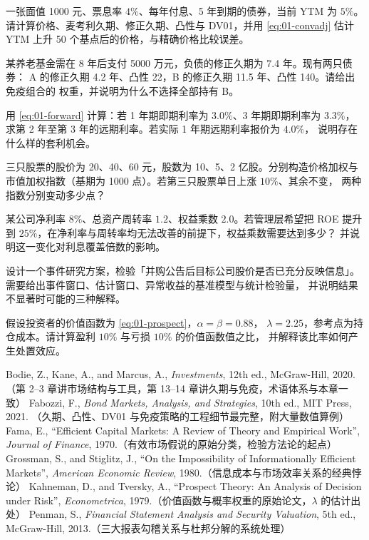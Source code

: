 \begin{exercises}
  \item 一张面值 1000 元、票息率 $4\%$、每年付息、5 年到期的债券，当前 YTM 为 $5\%$。
        请计算价格、麦考利久期、修正久期、凸性与 DV01，并用 \cref{eq:01-convadj} 估计
        YTM 上升 50 个基点后的价格，与精确价格比较误差。
  \item 某养老基金需在 8 年后支付 5000 万元，负债的修正久期为 7.4 年。现有两只债券：
        A 的修正久期 4.2 年、凸性 22，B 的修正久期 11.5 年、凸性 140。请给出免疫组合的
        权重，并说明为什么不选择全部持有 B。
  \item 用 \cref{eq:01-forward} 计算：若 1 年期即期利率为 $3.0\%$、3 年期即期利率为
        $3.3\%$，求第 2 年至第 3 年的远期利率。若实际 1 年期远期利率报价为 $4.0\%$，
        说明存在什么样的套利机会。
  \item 三只股票的股价为 20、40、60 元，股数为 10、5、2 亿股。分别构造价格加权与
        市值加权指数（基期为 1000 点）。若第三只股票单日上涨 $10\%$、其余不变，
        两种指数分别变动多少点？
  \item 某公司净利率 $8\%$、总资产周转率 $1.2$、权益乘数 $2.0$。若管理层希望把 ROE
        提升到 $25\%$，在净利率与周转率均无法改善的前提下，权益乘数需要达到多少？
        并说明这一变化对利息覆盖倍数的影响。
  \item 设计一个事件研究方案，检验「并购公告后目标公司股价是否已充分反映信息」。
        需要给出事件窗口、估计窗口、异常收益的基准模型与统计检验量，
        并说明结果不显著时可能的三种解释。
  \item 假设投资者的价值函数为 \cref{eq:01-prospect}，$\alpha = \beta = 0.88$，
        $\lambda = 2.25$，参考点为持仓成本。请计算盈利 $10\%$ 与亏损 $10\%$ 的价值函数值之比，
        并解释该比率如何产生处置效应。
\end{exercises}

\begin{furtherreading}
 Bodie, Z., Kane, A., and Marcus, A., \emph{Investments}, 12th ed., McGraw-Hill, 2020.
  （第 2--3 章讲市场结构与工具，第 13--14 章讲久期与免疫，术语体系与本章一致）
 Fabozzi, F., \emph{Bond Markets, Analysis, and Strategies}, 10th ed., MIT Press, 2021.
  （久期、凸性、DV01 与免疫策略的工程细节最完整，附大量数值算例）
 Fama, E., ``Efficient Capital Markets: A Review of Theory and Empirical Work'',
  \emph{Journal of Finance}, 1970.（有效市场假说的原始分类，检验方法论的起点）
 Grossman, S., and Stiglitz, J., ``On the Impossibility of Informationally Efficient Markets'',
  \emph{American Economic Review}, 1980.（信息成本与市场效率关系的经典悖论）
 Kahneman, D., and Tversky, A., ``Prospect Theory: An Analysis of Decision under Risk'',
  \emph{Econometrica}, 1979.（价值函数与概率权重的原始论文，$\lambda$ 的估计出处）
 Penman, S., \emph{Financial Statement Analysis and Security Valuation}, 5th ed.,
  McGraw-Hill, 2013.（三大报表勾稽关系与杜邦分解的系统处理）
\end{furtherreading}
